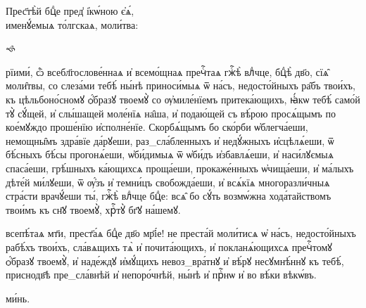 \documentclass[17pt]{extarticle}
\newcommand{\cuL}[1]{\scalebox{1.5}{\cuKinovarColor#1}}
\def\hyph{{\_}{}{}\penalty-10000}
\begin{document}
\pagestyle{empty}

\begin{center}
\begin{minipage}{.57\textwidth}\centering
	\vspace{-6pt}
	Прес҃тѣ̀й бцⷣе пред̾ і҆кѡ́ною є҆ѧ́, \\\vspace{-4pt} именꙋ́емыѧ то́лгскаѧ, моли́тва:
\end{minipage}
{\Large\noto 🙘}
\end{center}

\vspace{-8pt}
\cuL Прїими́, ѽ всебл҃гослове́ннаѧ и҆ всемо́щнаѧ пречⷭ҇таѧ гжⷭ҇ѣ̀ влⷣчце, бцⷣѣ̀ дв҃о, сїѧ̑ моли̑твы, со слеза́ми тебѣ́ ны́нѣ приноси́мыѧ ѿ на́съ, недосто́йныхъ ра̑бъ твои́хъ, къ цѣльбоно́сномꙋ ѻ҆́бразꙋ твоемꙋ̀ со ѹ҆миле́нїемъ притека́ющихъ, ꙗ҆́кѡ тебѣ́ само́й тꙋ̀ сꙋ́щей, и҆ слы́шащей моле́нїѧ на̑ша, и҆ подаю́щей съ вѣ́рою просѧ́щымъ по кое́мꙋждо проше́нїю и҆сполне́нїе. Скорбѧ́щымъ бо ско́рби ѡ҆блегча́еши, немощны̑мъ здра́вїе да́рꙋеши, раз\hyph сла́бленныхъ и҆ недꙋ́жныхъ и҆сцѣлѧ́еши, ѿ бѣ́сныхъ бѣ́сы прогонѧ́еши, ѡ҆би́димыѧ ѿ ѡ҆би́дъ и҆збавлѧ́еши, и҆ наси́лꙋємыѧ спаса́еши, грѣ́шныхъ ка́ющихсѧ проща́еши, прокаже́нныхъ ѡ҆чища́еши, и҆ ма́лыхъ дѣте́й ми́лꙋеши, ѿ ѹ҆́зъ и҆ темни́цъ свобожда́еши, и҆ всѧ́кїѧ многоразли́чныѧ стра́сти врачꙋ́еши ты́, гжⷭ҇ѣ̀ влⷣчце бцⷣе: всѧ̑ бо сꙋ́ть возмѡ́жна хода́тайствомъ твои́мъ къ сн҃ꙋ твоемꙋ̀, хрⷭ҇тꙋ̀ бг҃ꙋ на́шемꙋ.

\vspace{1pt}
\cuL Ѽ всепѣ́таѧ мт҃и, прест҃а́ѧ бцⷣе дв҃о мр҃і́е! не преста́й моли́тисѧ ѡ҆ на́съ, недосто́йныхъ рабѣ́хъ твои́хъ, сла́вѧщихъ тѧ̀ и҆ почита́ющихъ, и҆ покланѧ́ющихсѧ пречⷭ҇томꙋ ѻ҆́бразꙋ твоемꙋ̀, и҆ наде́ждꙋ и҆мꙋ́щихъ невоз\hyph вра́тнꙋ и҆ вѣ́рꙋ несꙋмнѣ́ннꙋ къ тебѣ́, приснодв҃ѣ пре\hyph сла́внѣй и҆ непоро́чнѣй, ны́нѣ и҆ прⷭ҇нѡ и҆ во вѣ́ки вѣкѡ́въ.

\vspace{-6pt}
\cuL{А҆}ми́нь.
\vspace{6pt}
\end{document}
